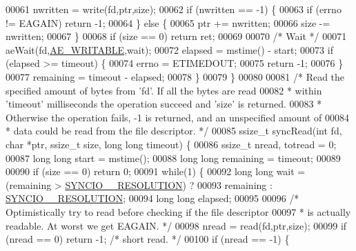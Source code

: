 \begin{DoxyCode}
00061         nwritten = write(fd,ptr,size);
00062         \textcolor{keywordflow}{if} (nwritten == -1) \{
00063             \textcolor{keywordflow}{if} (errno != EAGAIN) \textcolor{keywordflow}{return} -1;
00064         \} \textcolor{keywordflow}{else} \{
00065             ptr += nwritten;
00066             size -= nwritten;
00067         \}
00068         \textcolor{keywordflow}{if} (size == 0) \textcolor{keywordflow}{return} ret;
00069 
00070         \textcolor{comment}{/* Wait */}
00071         aeWait(fd,\hyperlink{ae_8h_ab6bfb0366ccb6277112d132c2a2bf500}{AE\_WRITABLE},wait);
00072         elapsed = mstime() - start;
00073         \textcolor{keywordflow}{if} (elapsed >= timeout) \{
00074             errno = ETIMEDOUT;
00075             \textcolor{keywordflow}{return} -1;
00076         \}
00077         remaining = timeout - elapsed;
00078     \}
00079 \}
00080 
00081 \textcolor{comment}{/* Read the specified amount of bytes from 'fd'. If all the bytes are read}
00082 \textcolor{comment}{ * within 'timeout' milliseconds the operation succeed and 'size' is returned.}
00083 \textcolor{comment}{ * Otherwise the operation fails, -1 is returned, and an unspecified amount of}
00084 \textcolor{comment}{ * data could be read from the file descriptor. */}
00085 ssize\_t syncRead(\textcolor{keywordtype}{int} fd, \textcolor{keywordtype}{char} *ptr, ssize\_t size, \textcolor{keywordtype}{long} \textcolor{keywordtype}{long} timeout) \{
00086     ssize\_t nread, totread = 0;
00087     \textcolor{keywordtype}{long} \textcolor{keywordtype}{long} start = mstime();
00088     \textcolor{keywordtype}{long} \textcolor{keywordtype}{long} remaining = timeout;
00089 
00090     \textcolor{keywordflow}{if} (size == 0) \textcolor{keywordflow}{return} 0;
00091     \textcolor{keywordflow}{while}(1) \{
00092         \textcolor{keywordtype}{long} \textcolor{keywordtype}{long} wait = (remaining > \hyperlink{syncio_8c_abba2f131af11e3cf265355831c9bcbb2}{SYNCIO\_\_RESOLUTION}) ?
00093                           remaining : \hyperlink{syncio_8c_abba2f131af11e3cf265355831c9bcbb2}{SYNCIO\_\_RESOLUTION};
00094         \textcolor{keywordtype}{long} \textcolor{keywordtype}{long} elapsed;
00095 
00096         \textcolor{comment}{/* Optimistically try to read before checking if the file descriptor}
00097 \textcolor{comment}{         * is actually readable. At worst we get EAGAIN. */}
00098         nread = read(fd,ptr,size);
00099         \textcolor{keywordflow}{if} (nread == 0) \textcolor{keywordflow}{return} -1; \textcolor{comment}{/* short read. */}
00100         \textcolor{keywordflow}{if} (nread == -1) \{

\end{DoxyCode}
